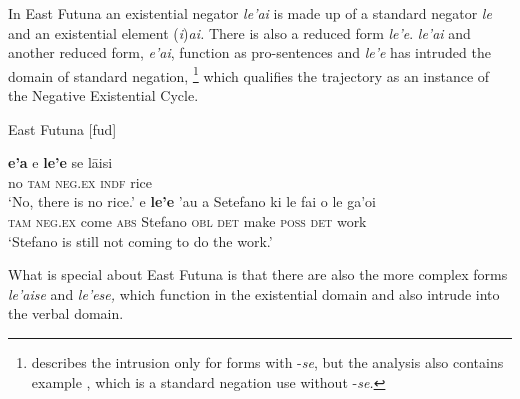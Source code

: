﻿\documentclass[output=paper]{langsci/langscibook}
\begin{document}
In East Futuna an existential negator \textit{le'ai} is made up of a
standard negator \textit{le} and an existential element
(\textit{i})\textit{ai.} There is also a reduced form \textit{le'e}.
\textit{le'ai} and another reduced form, \textit{e'ai}, function as
pro-sentences and \textit{le'e} has intruded the domain of standard
negation,%
%
    \footnote{\textcite[1364]{Veselinova2014} describes the intrusion
    only for forms with -\textit{se}, but the analysis also contains
    example , which is a standard negation use
    without -\textit{se.}} %
%
which qualifies the trajectory as an instance of the
Negative Existential Cycle. 
%
\begin{exe}\ex\label{ex:int-futuna-rice-Stefano}
East Futuna [fud] 
    \begin{xlist}
    \ex\label{ex:int-futuna-rice}
    \gll \textbf{e'a}   e   \textbf{le'e}     se   lāisi \\
    no  \textsc{tam}  \textsc{neg.ex}  \textsc{indf}  rice \\
    \glt `No, there is no rice.'
    \ex\label{ex:int-futuna-Stefano}
    \gll e \textbf{le'e} 'au a Setefano ki le fai o le ga'oi\\
      \textsc{tam}  \textsc{neg.ex}  come  \textsc{abs}  Stefano
      \textsc{obl} \textsc{det}   make    \textsc{poss}
      \textsc{det} work \\
    \glt `Stefano is still not coming to do the work.'
    \end{xlist}\end{exe}
%
What is special about East Futuna is that there are also the more complex
forms \textit{le'aise} and \textit{le'ese,} which function in the
existential domain and also intrude into the verbal domain. 
%
\end{document}
